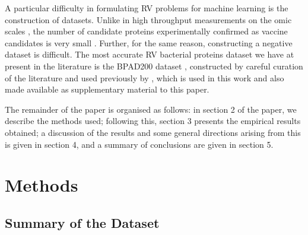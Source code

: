 \documentclass[10pt,journal,compsoc,twoside]{IEEEtran}
\begin{document}
A particular difficulty in formulating RV problems for machine learning is the construction of datasets. Unlike in high throughput measurements on the omic scales \cite{haussler-pnas-paper} \cite{spellman}, the number of candidate proteins experimentally confirmed as vaccine candidates is very small \cite{dalsass_2019}. Further, for the same reason, constructing a negative dataset is difficult. The most accurate RV bacterial proteins dataset we have at present in the literature is the BPAD200 dataset \cite{heinson_2017}, constructed by careful curation of the literature and used previously by \cite{heinson_2017} \cite{heinson_2019} \cite{dalsass_2019}, which is used in this work and also made available as supplementary material to this paper. 

The remainder of the paper is organised as follows: in section 2 of the paper, we describe the methods used; following this, section 3 presents the empirical results obtained; a discussion of the results and some general directions arising from this is given in section 4, and a summary of conclusions are given in section 5.


\section{Methods}
\label{sec:methods}

\subsection{Summary of the Dataset}
\label{sec:methods1}
\end{document}
